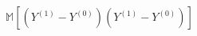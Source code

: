 \documentclass[preview]{standalone}
\begin{document}
\begin{align*}
\mathbb{M}[(Y^{(1)} - Y^{(0)})(Y^{(1)} - Y^{(0)})]
\end{align*}
\end{document}
